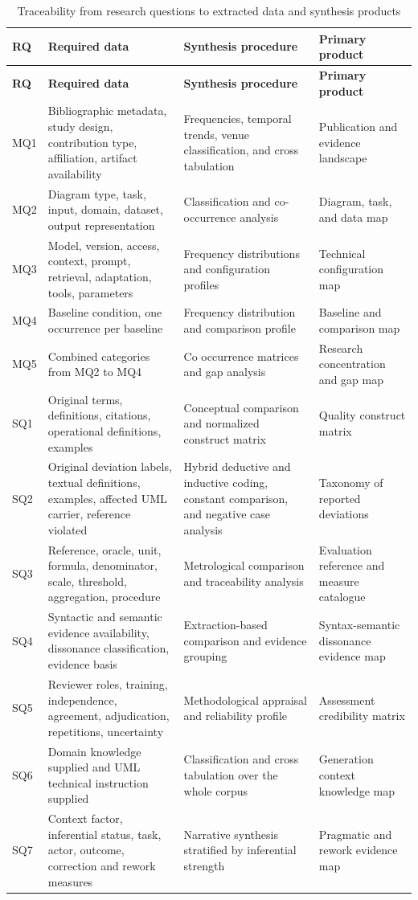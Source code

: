 \begin{longtable}{@{}p{} p{} p{} p{}@{}}
\caption{Traceability from research questions to extracted data and synthesis products}
\label{tab:protocol_rq_traceability}\\
\toprule
\textbf{RQ} & \textbf{Required data} & \textbf{Synthesis procedure} & \textbf{Primary product} \\
\midrule
\endfirsthead
\toprule
\textbf{RQ} & \textbf{Required data} & \textbf{Synthesis procedure} & \textbf{Primary product} \\
\midrule
\endhead
MQ1 & Bibliographic metadata, study design, contribution type, affiliation, artifact availability & Frequencies, temporal trends, venue classification, and cross tabulation & Publication and evidence landscape \\
MQ2 & Diagram type, task, input, domain, dataset, output representation & Classification and co-occurrence analysis & Diagram, task, and data map \\
MQ3 & Model, version, access, context, prompt, retrieval, adaptation, tools, parameters & Frequency distributions and configuration profiles & Technical configuration map \\
MQ4 & Baseline condition, one occurrence per baseline & Frequency distribution and comparison profile & Baseline and comparison map \\
MQ5 & Combined categories from MQ2 to MQ4 & Co occurrence matrices and gap analysis & Research concentration and gap map \\
SQ1 & Original terms, definitions, citations, operational definitions, examples & Conceptual comparison and normalized construct matrix & Quality construct matrix \\
SQ2 & Original deviation labels, textual definitions, examples, affected UML carrier, reference violated & Hybrid deductive and inductive coding, constant comparison, and negative case analysis & Taxonomy of reported deviations \\
SQ3 & Reference, oracle, unit, formula, denominator, scale, threshold, aggregation, procedure & Metrological comparison and traceability analysis & Evaluation reference and measure catalogue \\
SQ4 & Syntactic and semantic evidence availability, dissonance classification, evidence basis & Extraction-based comparison and evidence grouping & Syntax-semantic dissonance evidence map \\
SQ5 & Reviewer roles, training, independence, agreement, adjudication, repetitions, uncertainty & Methodological appraisal and reliability profile & Assessment credibility matrix \\
SQ6 & Domain knowledge supplied and UML technical instruction supplied & Classification and cross tabulation over the whole corpus & Generation context knowledge map \\
SQ7 & Context factor, inferential status, task, actor, outcome, correction and rework measures & Narrative synthesis stratified by inferential strength & Pragmatic and rework evidence map \\
\bottomrule
\end{longtable}

